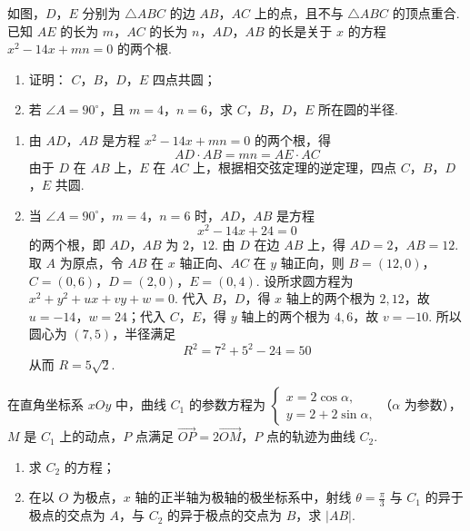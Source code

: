 \begin{problem}
如图，\(D\)，\(E\) 分别为 \(\triangle ABC\) 的边 \(AB\)，\(AC\) 上的点，且不与 \(\triangle ABC\) 的顶点重合.
已知 \(AE\) 的长为 \(m\)，\(AC\) 的长为 \(n\)，\(AD\)，\(AB\) 的长是关于 \(x\) 的方程 \(x^{2} - 14x + mn = 0\) 的两个根.
\begin{enumerate}
\item 证明： \(C\)，\(B\)，\(D\)，\(E\) 四点共圆；
\item 若 \(\angle A = 90^{\circ}\)，且 \(m = 4\)，\(n = 6\)，求 \(C\)，\(B\)，\(D\)，\(E\) 所在圆的半径.
\end{enumerate}

\end{problem}

\begin{solution}
\begin{enumerate}
\item 由 \(AD\)，\(AB\) 是方程 \(x^2-14x+mn=0\) 的两个根，得
\[
AD\cdot AB=mn=AE\cdot AC
\]
由于 \(D\) 在 \(AB\) 上，\(E\) 在 \(AC\) 上，根据相交弦定理的逆定理，四点 \(C\)，\(B\)，\(D\)，\(E\) 共圆.
\item 当 \(\angle A=90^\circ\)，\(m=4\)，\(n=6\) 时，\(AD\)，\(AB\) 是方程
\[
x^2-14x+24=0
\]
的两个根，即 \(AD\)，\(AB\) 为 \(2\)，\(12\). 由 \(D\) 在边 \(AB\) 上，得 \(AD=2\)，\(AB=12\). 取 \(A\) 为原点，令 \(AB\) 在 \(x\) 轴正向、\(AC\) 在 \(y\) 轴正向，则
    \(B=(12,0)\)，\(C=(0,6)\)，\(D=(2,0)\)，\(E=(0,4)\).
设所求圆方程为 \(x^2+y^2+ux+vy+w=0\). 代入 \(B\)，\(D\)，得 \(x\) 轴上的两个根为 \(2,12\)，故 \(u=-14\)，\(w=24\)；代入 \(C\)，\(E\)，得 \(y\) 轴上的两个根为 \(4,6\)，故 \(v=-10\). 所以圆心为 \((7,5)\)，半径满足
\[
R^2=7^2+5^2-24=50
\]
从而 \(R=5\sqrt{2}\).
\end{enumerate}
\end{solution}

\begin{problem}
在直角坐标系 \(xOy\) 中，曲线 \(C_1\) 的参数方程为 \(\begin{cases}
x = 2\cos \alpha,\\
y = 2 + 2\sin \alpha,
\end{cases}\)（\(\alpha\) 为参数），\(M\) 是 \(C_1\) 上的动点，\(P\) 点满足 \(\overrightarrow{OP} = 2\overrightarrow{OM}\)，\(P\) 点的轨迹为曲线 \(C_2\).
\begin{enumerate}
\item 求 \(C_2\) 的方程；
\item 在以 \(O\) 为极点，\(x\) 轴的正半轴为极轴的极坐标系中，射线 \( \theta = \frac{\pi}{3} \) 与 \(C_1\) 的异于极点的交点为 \(A\)，与 \(C_2\) 的异于极点的交点为 \(B\)，求 \(|AB|\).
\end{enumerate}
\end{problem}

